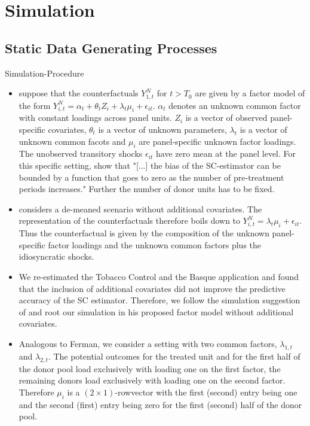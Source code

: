 \section{Simulation}

\subsection{Static Data Generating Processes}

Simulation-Procedure
\begin{itemize}
	\item \cite{abadie:2010} suppose that the counterfactuals $Y_{1,t}^{N}$ for $t > T_0$ are given by a factor model of the form $Y_{i,t}^{N} = \alpha_t + \theta_t Z_i + \lambda_t \mu_i + \epsilon_{it}$. $\alpha_t$ denotes an unknown common factor with constant loadings across panel units. $Z_i$ is a vector of observed panel-specific covariates, $\theta_t$ is a vector of unknown parameters, $\lambda_t$ is a vector of unknown common facots and $\mu_i$ are panel-specific unknown factor loadings. The unobserved transitory shocks $\epsilon_{it}$ have zero mean at the panel level. For this specific setting, \cite{abadie:2010} show that "[...] the bias of the SC-estimator can be bounded by a function that goes to zero as the number of pre-treatment periods increases." Further the number of donor units has to be fixed.
	\item \cite{ferman:2021} considers a de-meaned scenario without additional covariates. The representation of the counterfactuals therefore boils down to $Y_{i,t}^{N} = \lambda_t \mu_i + \epsilon_{it}$. Thus the counterfactual is given by the composition of the unknown panel-specific factor loadings and the unknown common factors plus the idiosyncratic shocks.
	\item We re-estimated the Tobacco Control and the Basque application and found that the inclusion of additional covariates did not improve the predictive accuracy of the SC estimator. Therefore, we follow the simulation suggestion of \cite{ferman:2021} and root our simulation in his proposed factor model without additional covariates. 
	\item Analogous to Ferman, we consider a setting with two common factors, $\lambda_{1,t}$ and $\lambda_{2,t}$. The potential outcomes for the treated unit and for the first half of the donor pool load exclusively with loading one on the first factor, the remaining donors load exclusively with loading one on the second factor. Therefore $\mu_i$ is a $(2 \times 1)$-rowvector with the first (second) entry being one and the second (first) entry being zero for the first (second) half of the donor pool.	

\end{itemize}
